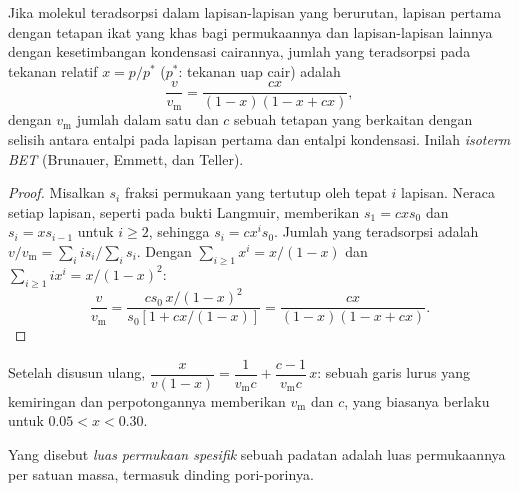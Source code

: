 \begin{theorem}\label{thm:b3:surfaces-catalysis:bet}
Jika molekul teradsorpsi dalam lapisan-lapisan yang berurutan, lapisan pertama
dengan tetapan ikat yang khas bagi permukaannya dan lapisan-lapisan lainnya
dengan kesetimbangan kondensasi cairannya, jumlah yang teradsorpsi pada
tekanan relatif $x = p/p^*$ ($p^*$: tekanan uap  cair) adalah
\[
  \frac{v}{v_{\mathrm m}} = \frac{cx}{(1 - x)(1 - x + cx)},
\]
dengan $v_{\mathrm m}$ jumlah dalam satu  dan $c$ sebuah tetapan
yang berkaitan dengan selisih antara entalpi  pada lapisan pertama dan
entalpi kondensasi. Inilah \emph{isoterm BET} (Brunauer,
Emmett, dan Teller).
\end{theorem}

\begin{proof}
Misalkan $s_i$ fraksi permukaan yang tertutup oleh tepat $i$ lapisan. Neraca
setiap lapisan, seperti pada bukti Langmuir, memberikan $s_1 = cxs_0$ dan $s_i =
xs_{i-1}$ untuk $i \ge 2$, sehingga $s_i = cx^is_0$. Jumlah yang teradsorpsi adalah $v/v_{\mathrm m} =
\sum_iis_i/\sum_is_i$. Dengan $\sum_{i\ge1}x^i = x/(1 - x)$ dan $\sum_{i\ge1}ix^i = x/(1 - x)^2$:
\[
  \frac{v}{v_{\mathrm m}} = \frac{cs_0\,x/(1 - x)^2}{s_0[1 + cx/(1 - x)]} = \frac{cx}{(1 - x)(1 - x + cx)} .
\]
\end{proof}

Setelah disusun ulang, $\dfrac{x}{v(1 - x)} = \dfrac{1}{v_{\mathrm m}c} + \dfrac{c - 1}{v_{\mathrm m}c}\,x$: sebuah garis lurus yang kemiringan dan
perpotongannya memberikan $v_{\mathrm m}$ dan $c$, yang biasanya berlaku untuk $0.05 < x < 0.30$.

\begin{definition}\label{def:b3:surfaces-catalysis:surface-area}
Yang disebut \emph{luas permukaan spesifik} sebuah padatan adalah
luas permukaannya per satuan massa, termasuk dinding pori-porinya.
\end{definition}

